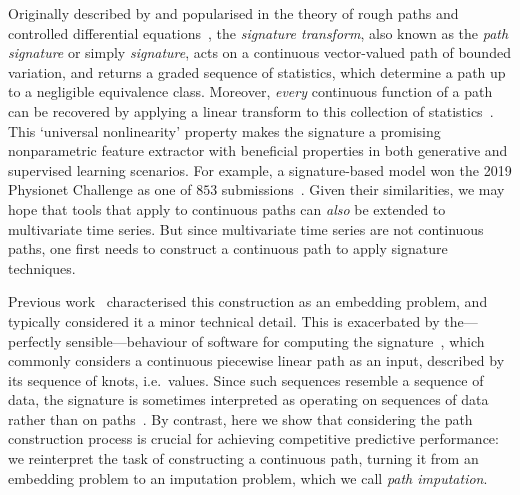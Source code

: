 \documentclass{article}
\begin{document}
Originally described by \citet{Chen54, Chen57, Chen58} and popularised
in the theory of rough paths and controlled differential
equations~\cite{lyons1998differential, FritzVictoir10, lyons2014rough},
the \emph{signature transform}, also known as the \emph{path signature}
or simply \emph{signature}, acts on a continuous vector-valued path of
bounded variation, and returns a graded sequence of statistics, which
determine a path up to a negligible equivalence class. Moreover,
\emph{every} continuous function of a path can be recovered by applying
a linear transform to this collection of statistics~\citep[Proposition
A.6]{kidger2019deep}.
%
This `universal nonlinearity' property makes the signature a promising nonparametric
feature extractor with beneficial properties in both generative and
supervised learning scenarios.
%
For example, a signature-based model won the 2019 Physionet Challenge as one of $853$ submissions~\citep{reyna2019early, morrill2019signature}.
Given their similarities, we may hope that tools that
apply to continuous paths can \emph{also} be extended to multivariate
time series. But since multivariate time series are not continuous
paths, one first needs to construct a continuous path to apply signature techniques.

Previous work~\citep{levin2013, kidger2019deep, fermanian2019embedding}
characterised this construction as an embedding problem, and
typically considered it a minor technical detail.
This is exacerbated by the---perfectly sensible---behaviour of software
for computing the signature~\citep{iisignature, signatory}, which
commonly considers a continuous piecewise linear path as an input,
described by its sequence of knots, i.e.\ values.
%
Since such sequences resemble a sequence of data, the signature is
sometimes interpreted as operating on sequences of data rather than on
paths~\cite{kidger2019deep, levin2013}.
%
By contrast, here we show that considering the path construction
process is crucial for achieving competitive predictive
performance: we reinterpret the task of constructing a continuous path,
turning it from an embedding problem to an imputation problem, which we
call \emph{path imputation}.
%
\end{document}

